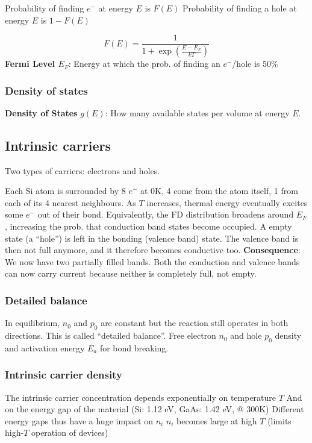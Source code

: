 \documentclass[a4paper, fontsize=8pt, landscape, DIV=1]{scrartcl}
\begin{document}
\begin{multicols*}{4}
  Probability of finding $e^-$ at energy $E$ is $F(E)$
  Probability of finding a hole at energy $E$ is $1-F(E)$

  \[F(E) = \frac{1}{1+\exp\left(\frac{E-E_F}{kT}\right)}\]
  \textbf{Fermi Level $E_F$}: Energy at which the prob. of finding an $e^-$/hole is 50\%

  \subsubsection{Density of states}
  \textbf{Density of States} $g(E)$: How many available states per volume at energy $E$.
  
  \subsection{Intrinsic carriers}
  Two types of carriers: electrons and holes.
  
  \ifdefined\makeultracompact\else
    Each Si atom is surrounded by 8 $e^-$ at 0K, 4 come from the atom itself, 1 from each of its 4 nearest neighbours.
    As $T$ increases, thermal energy eventually excites some $e^-$ out of their bond. 
    Equivalently, the FD distribution broadens around $E_F$, increasing the prob. that conduction band states become occupied.
    A empty state (a ``hole'') is left in the bonding (valence band) state. 
    The valence band is then not full anymore, and it therefore becomes conductive too.
    \textbf{Consequence}: We now have two partially filled bands. 
    Both the conduction and valence bands can now carry current because neither is completely full, not empty.
  \fi
  
  \subsubsection{Detailed balance}
  In equilibrium, $n_0$ and $p_0$ are constant but the reaction still operates in both directions. This is called ``detailed balance''.
  Free electron $n_0$ and hole $p_0$ density and activation energy $E_a$ for bond breaking.

  \subsubsection{Intrinsic carrier density}
  \ifdefined\makeultracompact\else
    The intrinsic carrier concentration depends exponentially on temperature $T$
    And on the energy gap of the material (Si: 1.12 eV, GaAs: 1.42 eV, @ 300K)
    Different energy gaps thus have a huge impact on $n_i$
    $n_i$ becomes large at high $T$ (limits high-$T$ operation of devices)
  \fi


\end{multicols*}
\end{document}
